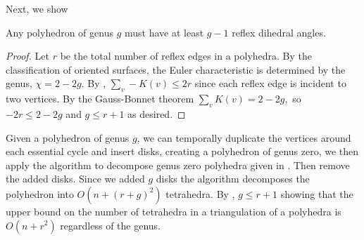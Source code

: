 Next, we show
\begin{theorem}\label{thm:reflex}

Any polyhedron of genus $g$ must have 
at least $g-1$ reflex dihedral angles. 

\end{theorem}
\begin{proof}
Let $r$ be the total number of reflex edges in a polyhedra.
By the classification of oriented surfaces, the Euler characteristic 
 is determined by the genus, $\chi=2-2g$.
By , $\sum_v -K(v)\leq 2 r$ since each
reflex edge is incident to two vertices.
By the Gauss-Bonnet theorem $\sum_vK(v)= 2-2g,$
so $-2r\leq 2-2g$ and $g\leq r+1$ as desired.

\end{proof}

Given a polyhedron of genus $g$, we can temporally 
duplicate the vertices around each essential cycle and insert disks,
 creating a polyhedron of genus zero, we then apply the algorithm to
decompose genus zero polyhedra given in \cite{triangulating-polytope-1990}.
Then remove the added disks.
Since we added $g$ disks the algorithm decomposes
the polyhedron into $O(n+ (r+g)^2)$ tetrahedra.
By , $g\leq r+1$ showing that the upper bound
on the number of tetrahedra in a triangulation
of a polyhedra is $O(n+r^2)$ regardless of the genus.

